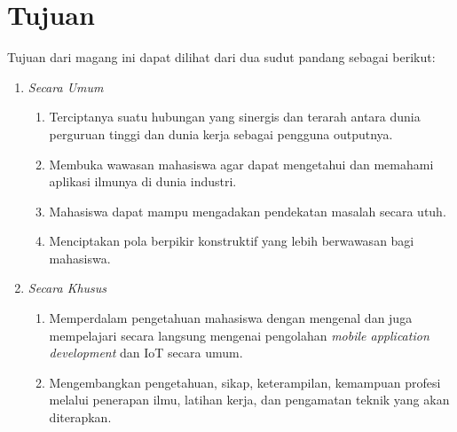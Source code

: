 \section{Tujuan}

Tujuan dari magang ini dapat dilihat dari dua
sudut pandang sebagai berikut:

\vspace{0.5ex}

\begin{enumerate}[nolistsep]

      \item \textit{Secara Umum}
            \vspace{0.5ex}

            \begin{enumerate}[nolistsep]
                  \item Terciptanya suatu hubungan yang sinergis dan terarah antara dunia
                        perguruan tinggi dan dunia kerja sebagai pengguna outputnya.

                  \item Membuka wawasan mahasiswa agar dapat mengetahui dan memahami
                        aplikasi ilmunya di dunia industri.

                  \item Mahasiswa dapat mampu mengadakan pendekatan masalah secara utuh.

                  \item Menciptakan pola berpikir konstruktif yang
                        lebih berwawasan bagi mahasiswa.

            \end{enumerate}

            \vspace{0.5ex}

      \item \textit{Secara Khusus}
            \vspace{0.5ex}

            \begin{enumerate}[nolistsep]
                  \item Memperdalam pengetahuan mahasiswa dengan mengenal dan juga mempelajari
                        secara langsung mengenai pengolahan \textit{mobile application development} dan IoT secara umum.

                  \item Mengembangkan pengetahuan, sikap, keterampilan, kemampuan profesi melalui
                        penerapan ilmu, latihan kerja, dan pengamatan teknik yang akan diterapkan.
            \end{enumerate}

\end{enumerate}

